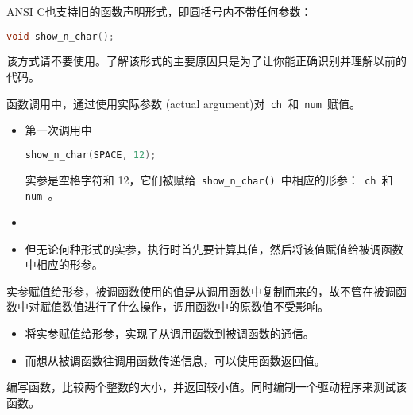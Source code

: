 \begin{frame}[fragile]
ANSI C也支持旧的函数声明形式，即圆括号内不带任何参数：
\begin{lstlisting}[language=c,backgroundcolor=\color{red!10}]
void show_n_char();
\end{lstlisting}
该方式请不要使用。了解该形式的主要原因只是为了让你能正确识别并理解以前的代码。
\end{frame}

\begin{frame}[fragile]
函数调用中，通过使用实际参数{ (actual argument)}对\lstinline| ch |和\lstinline| num |赋值。
\begin{itemize}
\item
第一次调用中
\begin{lstlisting}[language=c,backgroundcolor=\color{red!10}]
show_n_char(SPACE, 12);
\end{lstlisting}
实参是空格字符和{ 12}，它们被赋给\lstinline| show_n_char() |中相应的形参：\lstinline| ch |和\lstinline| num |。\\[0.1in]
\item {}\\[0.1in]
\item 但无论何种形式的实参，执行时首先要计算其值，然后将该值赋值给被调函数中相应的形参。
\end{itemize}
\end{frame}

\begin{frame}[fragile]
实参赋值给形参，被调函数使用的值是从调用函数中复制而来的，故不管在被调函数中对赋值数值进行了什么操作，调用函数中的原数值不受影响。
\end{frame}

\begin{frame}[fragile]
\begin{itemize}
\item
将实参赋值给形参，实现了从调用函数到被调函数的通信。\\[0.1in]
\item
而想从被调函数往调用函数传递信息，可以使用函数返回值。
\end{itemize}

\end{frame}

\begin{frame}[fragile]
  \begin{wenti}
    编写函数，比较两个整数的大小，并返回较小值。同时编制一个驱动程序来测试该函数。
  \end{wenti}
\end{frame}


